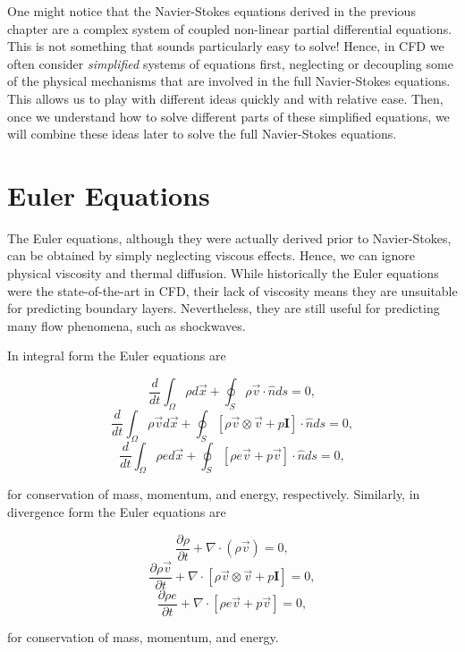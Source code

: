 One might notice that the Navier-Stokes equations derived in the previous chapter are a complex system of coupled non-linear partial differential equations. This is not something that sounds particularly easy to solve! Hence, in CFD we often consider {\it simplified} systems of equations first, neglecting or decoupling some of the physical mechanisms that are involved in the full Navier-Stokes equations. This allows us to play with different ideas quickly and with relative ease. Then, once we understand how to solve different parts of these simplified equations, we will combine these ideas later to solve the full Navier-Stokes equations. 

\section{Euler Equations}
The Euler equations, although they were actually derived prior to Navier-Stokes, can be obtained by simply neglecting viscous effects. Hence, we can ignore physical viscosity and thermal diffusion. While historically the Euler equations were the state-of-the-art in CFD, their lack of viscosity means they are unsuitable for predicting boundary layers. Nevertheless, they are still useful for predicting many flow phenomena, such as shockwaves.

In integral form the Euler equations are
\begin{eqBox}
\begin{equation}
	 \frac{d}{dt}\int_\Omega \rho d\vec{x} + \oint_S \rho \vec{v} \cdot \hat{n} ds = 0,
\end{equation}
\begin{equation}
	\frac{d}{dt}\int_\Omega \rho \vec{v} d\vec{x} + \oint_S \left[ \rho \vec{v} \otimes \vec{v} + p \mathbf{I} \right]\cdot \hat{n} ds =  0,
\end{equation}
\begin{equation}
	\frac{d}{dt}\int_\Omega \rho e d\vec{x} + \oint_S \left[ \rho e \vec{v} + p\vec{v} \right] \cdot \hat{n} ds = 0,
\end{equation}
\end{eqBox}
for conservation of mass, momentum, and energy, respectively. Similarly, in divergence form the Euler equations are
\begin{eqBox}
\begin{equation}
	 \frac{\partial \rho}{\partial t} + \nabla \cdot (\rho \vec{v}) = 0,
\end{equation}
\begin{equation}
	\frac{\partial \rho \vec{v}}{\partial t} + \nabla \cdot \left[ \rho \vec{v} \otimes \vec{v} + p \mathbf{I} \right] =  0,
\end{equation}
\begin{equation}
	\frac{\partial \rho e}{\partial t} + \nabla \cdot \left[ \rho e \vec{v} + p\vec{v} \right] = 0,
\end{equation}
\end{eqBox}
for conservation of mass, momentum, and energy.

